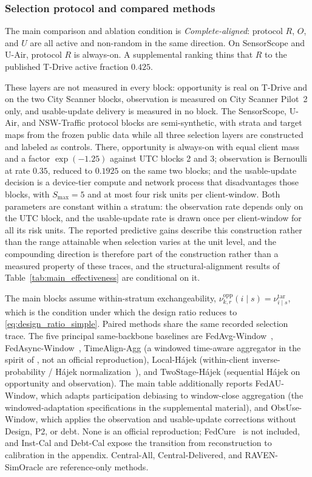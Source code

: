 \documentclass[letterpaper,journal]{IEEEtran}
\begin{document}
\subsubsection{Selection protocol and compared methods}

The main comparison and ablation condition is \emph{Complete-aligned}: protocol $R$, $O$,
and $U$ are all active and non-random in the same direction.  On
SensorScope and U-Air, protocol $R$ is always-on.  A supplemental ranking
thins that $R$ to the published T-Drive active fraction $0.425$.

These layers are not measured in every block: opportunity is real on T-Drive and
on the two City Scanner blocks, observation is measured on City Scanner Pilot~2
only, and usable-update delivery is measured in no block.  The SensorScope,
U-Air, and NSW-Traffic protocol blocks are semi-synthetic, with strata and target
maps from the frozen public data while all three selection layers are constructed
and labeled as controls.  There, opportunity is always-on with equal client mass
and a factor $\exp(-1.25)$ against UTC blocks 2 and 3; observation is Bernoulli at
rate $0.35$, reduced to $0.1925$ on the same two blocks; and the usable-update
decision is a device-tier compute and network process that disadvantages those
blocks, with $S_{\max}=5$ and at most four risk units per client-window.  Both
parameters are constant within a stratum: the observation rate depends only on
the UTC block, and the usable-update rate is drawn once per client-window for all
its risk units.  The reported predictive gains describe this construction rather
than the range attainable when selection varies at the unit level, and the
compounding direction is therefore part of the construction rather than a
measured property of these traces, and the structural-alignment results of
Table~\ref{tab:main_effectiveness} are conditional on it.

The main blocks assume within-stratum exchangeability,
$\nu^{\mathrm{opp}}_{k,r}(i\mid s)=\nu^{\mathrm{tar}}_{i\mid s}$, which is the
condition under which the design ratio reduces to
\eqref{eq:design_ratio_simple}.  Paired methods share the same recorded selection trace.
The five principal same-backbone baselines are
FedAvg-Window~\cite{mcmahan2017communication},
FedAsync-Window~\cite{xie2019asynchronous},
TimeAlign-Agg (a windowed time-aware aggregator in the spirit of
\cite{wang2026federated}, not an official reproduction),
Local-H\'ajek (within-client inverse-probability / H\'ajek
normalization~\cite{horvitz1952generalization,hajek1971comment}), and
TwoStage-H\'ajek (sequential H\'ajek on opportunity and observation).  The main
table additionally reports FedAU-Window, which adapts participation debiasing
\cite{wang2024lightweight} to window-close aggregation (the
windowed-adaptation specifications in the supplemental material), and
ObsUse-Window, which applies the observation and usable-update corrections
without Design, P2, or debt.  None is an official reproduction;
FedCure~\cite{chen2026fedcure} is not included, and Inst-Cal and Debt-Cal expose
the transition from reconstruction to calibration in the appendix.
Central-All, Central-Delivered, and RAVEN-SimOracle are reference-only methods.
\end{document}
